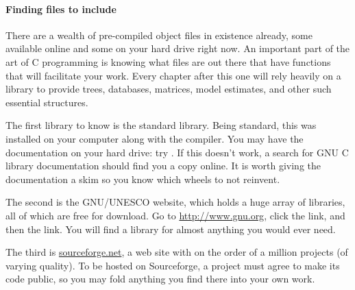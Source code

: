 \paragraph{\treesymbol{} Finding files to include}    
There are a wealth of pre-compiled object files in existence already,
some available online and some on your hard drive right now.  An
important part of the art of C programming is knowing what files are
out there that have functions that will facilitate your work. Every
chapter after this one will rely heavily on a library to provide trees,
databases, matrices, model estimates, and other such essential
structures.

The first library to know is the standard library. Being standard, this was
installed on your computer along with the compiler. You may have the
documentation on your hard drive: try . If this doesn't
work, a search for GNU C library documentation should find you a copy
online. It is worth giving the documentation a skim so you know which
wheels to not reinvent.

The second is the GNU/UNESCO website, which holds a huge
array of libraries, all of which are free for download. Go to
\url{http://www.gnu.org}, click the  link, and then
the  link. You will find a library for almost
anything you would ever need.

The third is \url{sourceforge.net}, a web site with on the order of a
million projects (of varying quality). To be hosted on Sourceforge,
a project must agree to make its code public, so you may fold anything
you find there into your own work.



